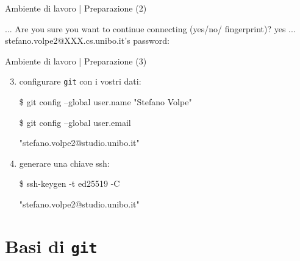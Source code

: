 \documentclass{beamer}
\begin{document}
\begin{frame}{Ambiente di lavoro | Preparazione (2)}
  \begin{semiverbatim}
  \lbrack ...\rbrack \newline
  Are you sure you want to continue connecting \newline (yes/no/\lbrack
  fingerprint\rbrack)? yes \newline
  \lbrack ...\rbrack \newline
  stefano.volpe2@XXX.cs.unibo.it's password:
  \end{semiverbatim}
\end{frame}

\begin{frame}{Ambiente di lavoro | Preparazione (3)}
  \begin{enumerate}
    \setcounter{enumi}{2}
    \item configurare \texttt{git} con i vostri dati:
    \begin{semiverbatim}
    \$ git config --global user.name "Stefano Volpe"
    \end{semiverbatim}
    \begin{semiverbatim}
    \$ git config --global user.email \\
    \end{semiverbatim}
    \begin{semiverbatim}
        \qquad"stefano.volpe2@studio.unibo.it"
    \end{semiverbatim}
  \item generare una chiave ssh:
    \begin{semiverbatim}
    \$ ssh-keygen -t ed25519 -C \\
    \end{semiverbatim}
    \begin{semiverbatim}
        \qquad"stefano.volpe2@studio.unibo.it"
    \end{semiverbatim}
  \end{enumerate}
\end{frame}

\section{Basi di \texttt{git}}
\end{document}
